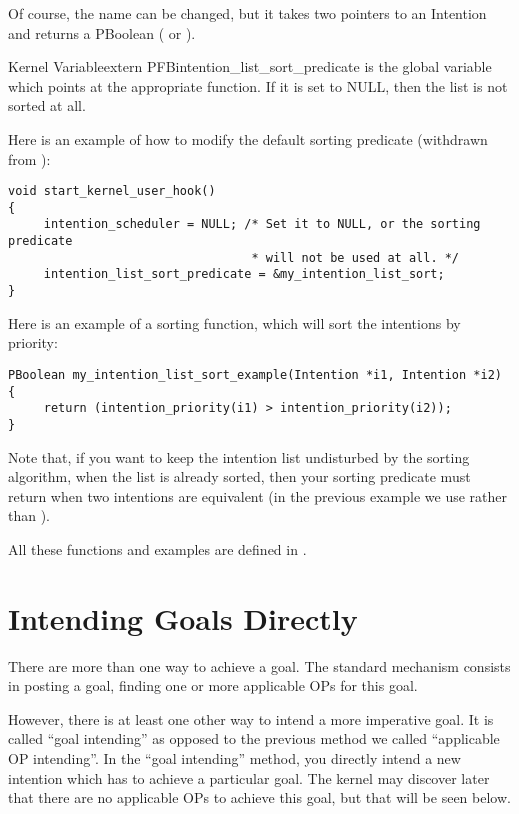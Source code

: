 Of course, the name can be changed, but it takes two pointers to an
Intention and returns a PBoolean ( or ).

\begin{typevr}{Kernel Variable}{extern PFB}{intention\_list\_sort\_predicate}
is the global variable which points at the appropriate function. If it is set
to NULL, then the list is not sorted at all.
\end{typevr}

Here is an example of how to modify the default sorting predicate (withdrawn
from ):

\begin{verbatim}
void start_kernel_user_hook()
{
     intention_scheduler = NULL; /* Set it to NULL, or the sorting predicate
                                  * will not be used at all. */
     intention_list_sort_predicate = &my_intention_list_sort;
}
\end{verbatim}

Here is an example of a sorting function, which will sort the intentions
by priority:

\begin{verbatim}
PBoolean my_intention_list_sort_example(Intention *i1, Intention *i2)
{
     return (intention_priority(i1) > intention_priority(i2));
}
\end{verbatim}

Note that, if you want to keep the intention list undisturbed by the sorting
algorithm, when the list is already sorted, then your sorting predicate must
return  when two intentions are equivalent (in the previous example we use
\code{>} rather than \code{>=}).

All these functions and examples are defined in .

\section{Intending Goals Directly}

There are more than one way to achieve a goal. The standard mechanism
consists in posting a goal, finding one or more applicable OPs for this
goal.

However, there is at least one other way to intend a more imperative goal. It
is called ``goal intending'' as opposed to the previous method we called
``applicable OP intending''. In the ``goal intending'' method, you directly
intend a new intention which has to achieve a particular goal. The kernel may
discover later that there are no applicable OPs to achieve this goal, but that
will be seen below.

